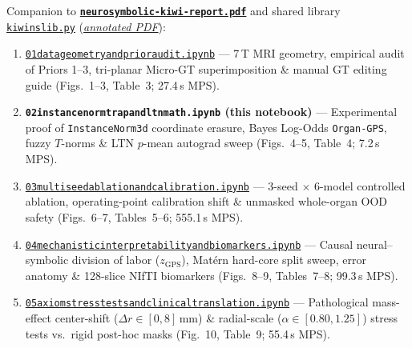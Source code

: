 \documentclass[10pt,a4paper]{article}
\renewcommand{\_}{\origunderscore\allowbreak}
\newcommand{\ghblob}{https://github.com/arvidl/BMED365-2027/blob/main}
\newcommand{\repodir}{Lab4-Comp-Imag/Kiwi-challenge/docs/neurosymbolic-report}
\begin{document}
\begin{seqbox}
{\footnotesize Companion to \href{\ghblob/\repodir/neurosymbolic-kiwi-report.pdf}{\textbf{\texttt{neurosymbolic-kiwi-report.pdf}}} and shared library \href{\ghblob/\repodir/notebooks/kiwi_ns_lib.py}{\texttt{kiwi\_ns\_lib.py}} (\href{\ghblob/\repodir/notebooks/kiwi_ns_lib_py.pdf}{\textit{annotated PDF}}):}
\begin{enumerate}[start=1, itemsep=1.2pt, topsep=2pt, font=\footnotesize]
    \item \href{\ghblob/\repodir/notebooks/01_data_geometry_and_prior_audit.ipynb}{\texttt{01\_data\_geometry\_and\_prior\_audit.ipynb}} --- 7\,T MRI geometry, empirical audit of Priors 1--3, tri-planar Micro-GT superimposition \& manual GT editing guide (Figs.\ 1--3, Table~3; 27.4\,s MPS).
    \item \textbf{\texttt{02\_instancenorm\_trap\_and\_ltn\_math.ipynb} (this notebook)} --- Experimental proof of \texttt{InstanceNorm3d} coordinate erasure, Bayes Log-Odds \texttt{Organ-GPS}, fuzzy $T$-norms \& LTN $p$-mean autograd sweep (Figs.\ 4--5, Table~4; 7.2\,s MPS).
    \item \href{\ghblob/\repodir/notebooks/03_multiseed_ablation_and_calibration.ipynb}{\texttt{03\_multiseed\_ablation\_and\_calibration.ipynb}} --- 3-seed $\times$ 6-model controlled ablation, operating-point calibration shift \& unmasked whole-organ OOD safety (Figs.\ 6--7, Tables~5--6; 555.1\,s MPS).
    \item \href{\ghblob/\repodir/notebooks/04_mechanistic_interpretability_and_biomarkers.ipynb}{\texttt{04\_mechanistic\_interpretability\_and\_biomarkers.ipynb}} --- Causal neural--symbolic division of labor ($z_{\text{GPS}}$), Mat\'ern hard-core split sweep, error anatomy \& 128-slice NIfTI biomarkers (Figs.\ 8--9, Tables~7--8; 99.3\,s MPS).
    \item \href{\ghblob/\repodir/notebooks/05_axiom_stress_tests_and_clinical_translation.ipynb}{\texttt{05\_axiom\_stress\_tests\_and\_clinical\_translation.ipynb}} --- Pathological mass-effect center-shift ($\Delta r \in [0, 8]$\,mm) \& radial-scale ($\alpha \in [0.80, 1.25]$) stress tests vs.\ rigid post-hoc masks (Fig.\ 10, Table~9; 55.4\,s MPS).
\end{enumerate}
\end{seqbox}
\end{document}
